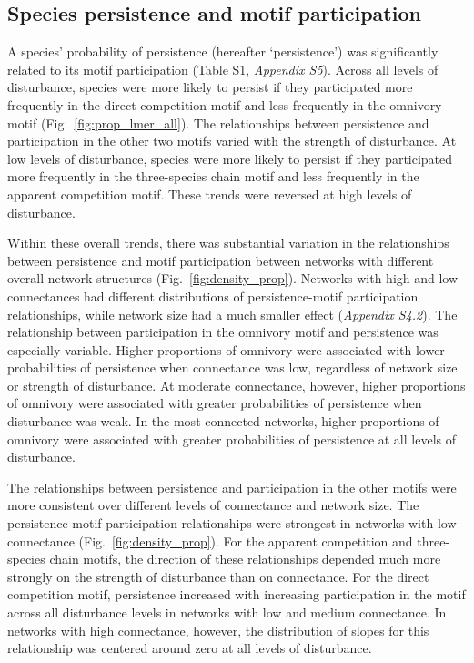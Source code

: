 \documentclass[12pt]{article}
\begin{document}
\begin{spacing}{2.0}
    \subsection*{Species persistence and motif participation} 

        A species' probability of persistence (hereafter `persistence') was significantly related to its motif participation (Table S1, \emph{Appendix S5}).
        Across all levels of disturbance, species were more likely to persist if they participated more frequently in the direct competition motif and less frequently in the omnivory motif (Fig.~\ref{fig:prop_lmer_all}).
        The relationships between persistence and participation in the other two motifs varied with the strength of disturbance.
        At low levels of disturbance, species were more likely to persist if they participated more frequently in the three-species chain motif and less frequently in the apparent competition motif.
        These trends were reversed at high levels of disturbance.
    

        Within these overall trends, there was substantial variation in the relationships between persistence and motif participation between networks with different overall network structures (Fig.~\ref{fig:density_prop}).
        Networks with high and low connectances had different distributions of persistence-motif participation relationships, while network size had a much smaller effect (\emph{Appendix S4.2}).
        The relationship between participation in the omnivory motif and persistence was especially variable.
        Higher proportions of omnivory were associated with lower probabilities of persistence when connectance was low, regardless of network size or strength of disturbance.
        At moderate connectance, however, higher proportions of omnivory were associated with greater probabilities of persistence when disturbance was weak.
        In the most-connected networks, higher proportions of omnivory were associated with greater probabilities of persistence at all levels of disturbance.

        The relationships between persistence and participation in the other motifs were more consistent over different levels of connectance and network size.
        The persistence-motif participation relationships were strongest in networks with low connectance (Fig.~\ref{fig:density_prop}).
        For the apparent competition and three-species chain motifs, the direction of these relationships depended much more strongly on the strength of disturbance than on connectance.
        For the direct competition motif, persistence increased with increasing participation in the motif across all disturbance levels in networks with low and medium connectance.
        In networks with high connectance, however, the distribution of slopes for this relationship was centered around zero at all levels of disturbance.



\end{spacing}
\end{document}

